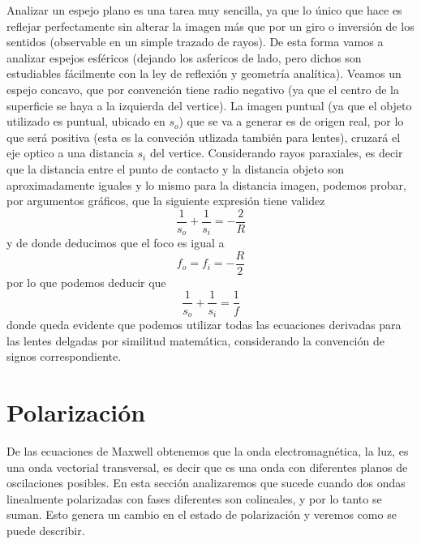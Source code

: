 \documentclass[a4paper]{article}
\numberwithin{equation}{section}
\begin{document}
		Analizar un espejo plano es una tarea muy sencilla, ya que lo único que hace es reflejar perfectamente sin alterar la imagen más que por un giro o inversión de los sentidos (observable en un simple trazado de rayos). De esta forma vamos a analizar espejos esféricos (dejando los asfericos de lado, pero dichos son estudiables fácilmente con la ley de reflexión y geometría analítica). Veamos un espejo concavo, que por convención tiene radio negativo (ya que el centro de la superficie se haya a la izquierda del vertice). La imagen puntual (ya que el objeto utilizado es puntual, ubicado en $s_o$) que se va a generar es de origen real, por lo que será positiva (esta es la conveción utlizada también para lentes), cruzará el eje optico a una distancia $s_i$ del vertice. Considerando rayos paraxiales, es decir que la distancia entre el punto de contacto y la distancia objeto son aproximadamente iguales y lo mismo para la distancia imagen, podemos probar, por argumentos gráficos, que la siguiente expresión tiene validez
		\begin{equation}
			\frac{1}{s_o} + \frac{1}{s_i} = - \frac{2}{R}
			\label{eq:espejos_esfericos}
		\end{equation}
		y de donde deducimos que el foco es igual a
		\begin{equation}
			f_o = f_i = - \frac{R}{2}
			\label{eq:espejos_esfericos_foco}
		\end{equation}
		por lo que podemos deducir que
		\begin{equation}
		 \frac{1}{s_o} + \frac{1}{s_i} = \frac{1}{f}
		 \label{eq:espejos_esfericos_ecuacion}
		\end{equation}
		donde queda evidente que podemos utilizar todas las ecuaciones derivadas para las lentes delgadas por similitud matemática, considerando la convención de signos correspondiente.
		
\section{Polarización}
	De las ecuaciones de Maxwell obtenemos que la onda electromagnética, la luz, es una onda vectorial transversal, es decir que es una onda con diferentes planos de oscilaciones posibles. En esta sección analizaremos que sucede cuando dos ondas linealmente polarizadas con fases diferentes son colineales, y por lo tanto se suman. Esto genera un cambio en el estado de polarización y veremos como se puede describir. 
\end{document}
